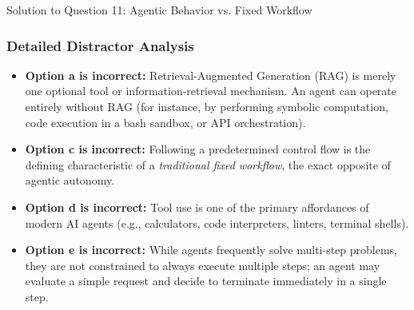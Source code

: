 \documentclass[11pt,a4paper]{article}
\begin{document}
\begin{solutionbox}{Solution to Question 11: Agentic Behavior vs. Fixed Workflow}
\subsubsection*{Detailed Distractor Analysis}
\begin{itemize}[leftmargin=1.5em]
    \item \textbf{Option a is incorrect:} Retrieval-Augmented Generation (RAG) is merely one optional tool or information-retrieval mechanism. An agent can operate entirely without RAG (for instance, by performing symbolic computation, code execution in a bash sandbox, or API orchestration).
    \item \textbf{Option c is incorrect:} Following a predetermined control flow is the defining characteristic of a \textit{traditional fixed workflow}, the exact opposite of agentic autonomy.
    \item \textbf{Option d is incorrect:} Tool use is one of the primary affordances of modern AI agents (e.g., calculators, code interpreters, linters, terminal shells).
    \item \textbf{Option e is incorrect:} While agents frequently solve multi-step problems, they are not constrained to always execute multiple steps; an agent may evaluate a simple request and decide to terminate immediately in a single step.
\end{itemize}
\end{solutionbox}
\end{document}
